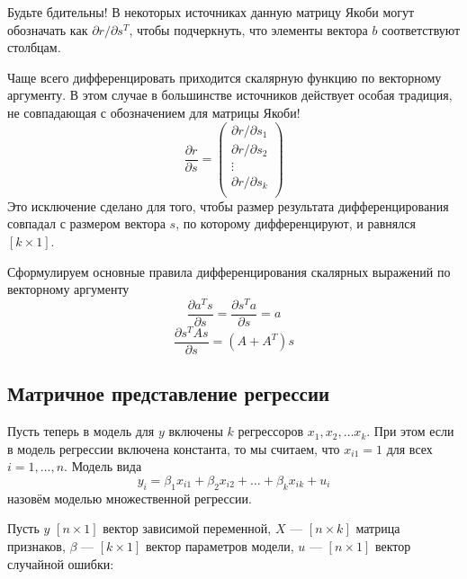 \documentclass[12pt]{article}
\begin{document}
Будьте бдительны! 
В некоторых источниках данную матрицу Якоби могут обозначать как $\partial r/\partial s^T$, чтобы подчеркнуть, что элементы вектора $b$ соответствуют столбцам. 

Чаще всего дифференцировать приходится скалярную функцию по векторному аргументу. 
В этом случае в большинстве источников  действует особая традиция, не совпадающая с обозначением для матрицы Якоби!
\[
\frac{\partial r}{\partial s} = \begin{pmatrix}
    \partial r/\partial s_1 \\
    \partial r/\partial s_2 \\
    \vdots \\
    \partial r/\partial s_k \\    
\end{pmatrix}
\]
Это исключение сделано для того, чтобы размер результата дифференцирования совпадал с размером вектора $s$, по которому дифференцируют, и равнялся $[k \times 1]$. 

Сформулируем основные правила дифференцирования скалярных выражений по векторному аргументу
\[
\frac{\partial a^T s}{\partial s} = \frac{\partial s^T a}{\partial s} = a
\]
\[
\frac{\partial s^T A s}{\partial s} = (A + A^T)s
\]









\subsection{Матричное представление регрессии}
Пусть теперь в модель для $y$ включены $k$ регрессоров $x_1, x_2, \dots x_k$. При этом если в модель регрессии включена константа, то мы считаем, что $x_{i1}=1$ для всех $i=1,...,n$. Модель вида
\[
y_i = \beta_1 x_{i1} + \beta_2 x_{i2} + \dots + \beta_k x_{ik} + u_i
\]
назовём моделью множественной регрессии.

Пусть $y$  $[n \times 1]$ вектор зависимой переменной, $X$ —  $[n \times k]$ матрица признаков, $\beta$ — $[k \times 1]$ вектор параметров модели, $u$ — $[n \times 1]$ вектор случайной ошибки:
\end{document}
